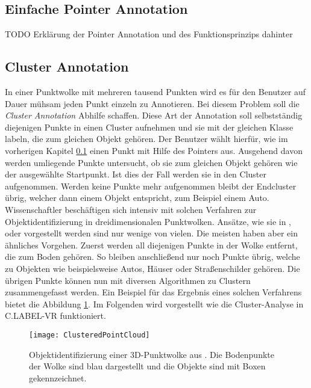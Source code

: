 \subsection{Einfache Pointer Annotation}
\label{sec:SimplePointerAnnotation}
TODO Erklärung der Pointer Annotation und des Funktionsprinzips dahinter

\subsection{Cluster Annotation}
In einer Punktwolke mit mehreren tausend Punkten wird es für den Benutzer auf Dauer mühsam jeden Punkt einzeln zu Annotieren. Bei diesem Problem soll die \textit{Cluster Annotation} Abhilfe schaffen. Diese Art der Annotation soll selbstständig diejenigen Punkte in einen Cluster aufnehmen und sie mit der gleichen Klasse labeln, die zum gleichen Objekt gehören. Der Benutzer wählt hierfür, wie im vorherigen Kapitel \ref{sec:SimplePointerAnnotation} einen Punkt mit Hilfe des Pointers aus. Ausgehend davon werden umliegende Punkte untersucht, ob sie zum gleichen Objekt gehören wie der ausgewählte Startpunkt. Ist dies der Fall werden sie in den Cluster aufgenommen. Werden keine Punkte mehr aufgenommen bleibt der Endcluster übrig, welcher dann einem Objekt entspricht, zum Beispiel einem Auto. \\

Wissenschaftler beschäftigen sich intensiv mit solchen Verfahren zur Objektidentifizierung in dreidimensionalen Punktwolken. Ansätze, wie sie in \cite{bib:Segmentation1}, \cite{bib:Segmentation2} oder \cite{bib:Segmentation3} vorgestellt werden sind nur wenige von vielen. Die meisten haben aber ein ähnliches Vorgehen. Zuerst werden all diejenigen Punkte in der Wolke entfernt, die zum Boden gehören. So bleiben anschließend nur noch Punkte übrig, welche zu Objekten wie beispielsweise Autos, Häuser oder Straßenschilder gehören. Die übrigen Punkte können nun mit diversen Algorithmen zu Clustern zusammengefasst werden. Ein Beispiel für das Ergebnis eines solchen Verfahrens bietet die Abbildung \ref{fig:ClusteredCloud}. Im Folgenden wird vorgestellt wie die Cluster-Analyse in C.LABEL-VR funktioniert.

\begin{figure}%
	\centering
    \texttt{[image: ClusteredPointCloud]}
    \caption{Objektidentifizierung einer 3D-Punktwolke aus \cite{bib:Segmentation1}. Die Bodenpunkte der Wolke sind blau dargestellt und die Objekte sind mit Boxen gekennzeichnet.}
    \label{fig:ClusteredCloud}
\end{figure}

